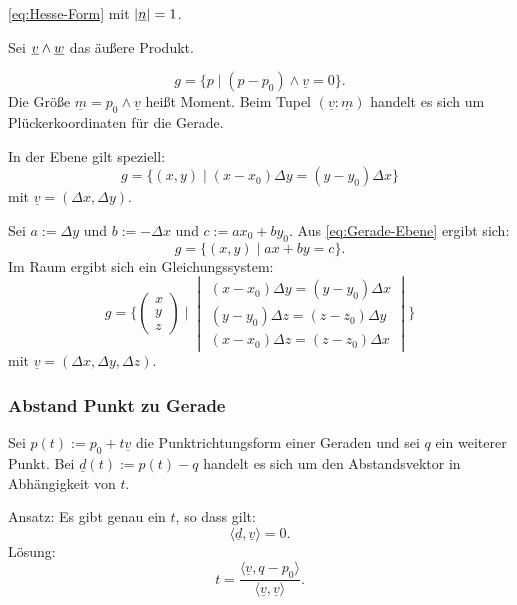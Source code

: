  \eqref{eq:Hesse-Form} mit $|\underline{n}|=1$.


Sei $\underline{v}\wedge\underline{w}$ das äußere Produkt.

\begin{equation}
g = \{p\mid (p-p_0)\wedge \underline v=0\}.
\end{equation}
Die Größe $\underline m = p_0\wedge\underline v$ heißt Moment.
Beim Tupel $(\underline v:\underline m)$ handelt es sich um
Plückerkoordinaten für die Gerade.

In der Ebene gilt speziell:
\begin{equation}\label{eq:Gerade-Ebene}
g = \{(x,y)\mid (x-x_0)\Delta y = (y-y_0)\Delta x\}
\end{equation}
mit $\underline v=(\Delta x,\Delta y)$.

Sei $a:=\Delta y$ und $b:=-\Delta x$ und $c:=ax_0+by_0$.
Aus \eqref{eq:Gerade-Ebene} ergibt sich:
\begin{equation}
g = \{(x,y)\mid ax+by=c\}.
\end{equation}
Im Raum ergibt sich ein Gleichungssystem:
\begin{equation}
g = \{\begin{pmatrix}x\\ y\\ z\end{pmatrix}
\mid
\begin{vmatrix}
(x-x_0)\Delta y = (y-y_0)\Delta x\\
(y-y_0)\Delta z = (z-z_0)\Delta y\\
(x-x_0)\Delta z = (z-z_0)\Delta x
\end{vmatrix}\}
\end{equation}
mit $\underline v=(\Delta x,\Delta y,\Delta z)$.

\subsubsection{Abstand Punkt zu Gerade}
Sei $p(t):=p_0+t\underline v$ die Punktrichtungsform einer Geraden und
sei $q$ ein weiterer Punkt. Bei $\underline d(t):=p(t)-q$ handelt
es sich um den Abstandsvektor in Abhängigkeit von $t$.

Ansatz: Es gibt genau ein $t$, so dass gilt:
\begin{equation}
\langle\underline d,\underline v\rangle=0.
\end{equation}
Lösung:
\begin{equation}
t = \frac
  {\langle\underline v,q{-}p_0\rangle}
  {\langle\underline v,\underline v\rangle}.
\end{equation}

